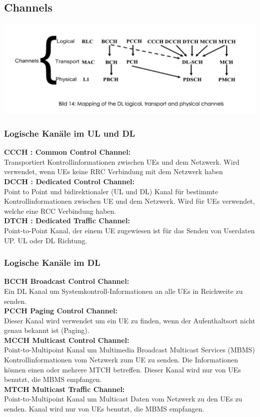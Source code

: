 \subsection{Channels}
\includegraphics[width = 0.8 \linewidth]{./Pics/Ch1.png}
\subsubsection{Logische Kanäle im UL und DL}
\textbf{CCCH : Common Control Channel: } \\
Transportiert Kontrollinformationen zwischen UEs und dem Netzwerk. Wird verwendet, wenn UEs keine RRC Verbindung mit dem Netzwerk haben \\
\textbf{DCCH : Dedicated Control Channel: } \\
Point to Point und bidirektionaler (UL und DL) Kanal für bestimmte Kontrollinformationen zwischen UE und dem Netzwerk. Wird für UEs verwendet, welche eine RCC Verbindung haben. \\
\textbf{DTCH : Dedicated Traffic Channel: } \\
Point-to-Point Kanal, der einem UE zugewiesen ist für das Senden von Userdaten UP. UL oder DL Richtung. \\
\subsubsection{Logische Kanäle im DL}
\textbf{BCCH Broadcast Control Channel: } \\
Ein DL Kanal um Systemkontroll-Informationen an alle UEs in Reichweite zu senden. \\
\textbf{PCCH Paging Control Channel: } \\
Dieser Kanal wird verwendet um ein UE zu finden, wenn der Aufenthaltsort nicht genau bekannt ist (Paging). \\
\textbf{MCCH Multicast Control Channel: } \\
Point-to-Multipoint Kanal um Multimedia Broadcast Multicast Services (MBMS) Kontrollinformationen vom Netzwerk zum UE zu senden. Die Informationen können einen oder mehrere MTCH betreffen. Dieser Kanal wird nur von UEs benutzt, die MBMS empfangen. \\
\textbf{MTCH Multicast Traffic Channel: } \\
Point-to-Multipoint Kanal um Multicast Daten vom Netzwerk zu den UEs zu senden. Kanal wird nur von UEs benutzt, die MBMS empfangen. \\
